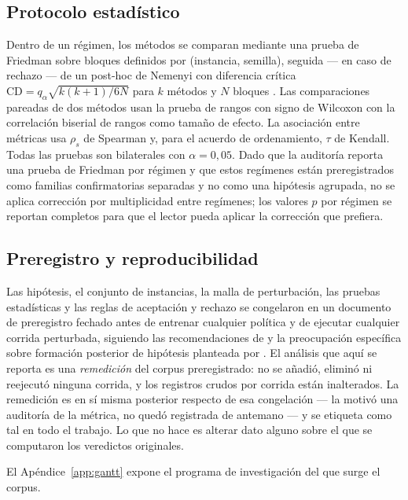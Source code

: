 \documentclass[a4paper,fleqn]{cas-sc}
\begin{document}
\subsection{Protocolo estadístico}\label{sec:stats}

Dentro de un régimen, los métodos se comparan mediante una prueba de Friedman
sobre bloques definidos por (instancia, semilla), seguida --- en caso de rechazo
--- de un post-hoc de Nemenyi con diferencia crítica
$\mathrm{CD}=q_{\alpha}\sqrt{k(k+1)/6N}$ para $k$ métodos y $N$ bloques
\citep{demsar2006,garcia2008}. Las comparaciones pareadas de dos métodos usan la
prueba de rangos con signo de Wilcoxon con la correlación biserial de rangos
como tamaño de efecto. La asociación entre métricas usa $\rho_s$ de Spearman y,
para el acuerdo de ordenamiento, $\tau$ de Kendall. Todas las pruebas son
bilaterales con $\alpha=0{,}05$. Dado que la auditoría reporta una prueba de
Friedman por régimen y que estos regímenes están preregistrados como familias
confirmatorias separadas y no como una hipótesis agrupada, no se aplica
corrección por multiplicidad entre regímenes; los valores $p$ por régimen se
reportan completos para que el lector pueda aplicar la corrección que prefiera.

\subsection{Preregistro y reproducibilidad}\label{sec:prereg}

Las hipótesis, el conjunto de instancias, la malla de perturbación, las pruebas
estadísticas y las reglas de aceptación y rechazo se congelaron en un documento
de preregistro fechado antes de entrenar cualquier política y de ejecutar
cualquier corrida perturbada, siguiendo las recomendaciones de
\citet{munafo2017} y la preocupación específica sobre formación posterior de
hipótesis planteada por \citet{kerr1998}. El análisis que aquí se reporta es una
\emph{remedición} del corpus preregistrado: no se añadió, eliminó ni reejecutó
ninguna corrida, y los registros crudos por corrida están inalterados. La
remedición es en sí misma posterior respecto de esa congelación --- la motivó
una auditoría de la métrica, no quedó registrada de antemano --- y se etiqueta
como tal en todo el trabajo. Lo que no hace es alterar dato alguno sobre el que
se computaron los veredictos originales.

El Apéndice~\ref{app:gantt} expone el programa de investigación del que surge el
corpus.

\end{document}
